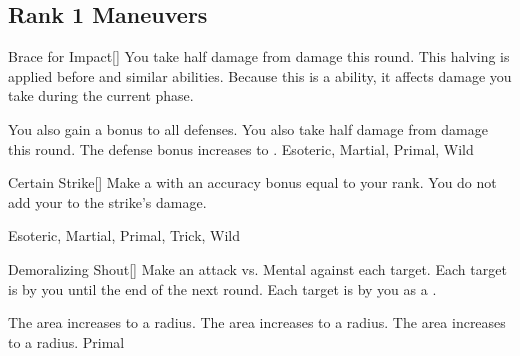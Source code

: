 \subsection{Rank 1 Maneuvers}

\lowercase{\hypertarget{maneuver:Brace for Impact}{}}\label{maneuver:Brace for Impact}
\hypertarget{maneuver:Brace for Impact}{}
\begin{freeability}[Rank 1]{Brace for Impact}[]
You take half damage from  damage this round.
This halving is applied before  and similar abilities.
Because this is a  ability, it affects damage you take during the current phase.

\rankline
{} You also gain a  bonus to all defenses.
 You also take half damage from  damage this round.
 The defense bonus increases to .
 Esoteric, Martial, Primal, Wild
\end{freeability}
\vspace{0.25em}



\lowercase{\hypertarget{maneuver:Certain Strike}{}}\label{maneuver:Certain Strike}
\hypertarget{maneuver:Certain Strike}{}
\begin{freeability}[Rank 1]{Certain Strike}[]
Make a  with an accuracy bonus equal to your rank.
You do not add your  to the strike's damage.


 Esoteric, Martial, Primal, Trick, Wild
\end{freeability}
\vspace{0.25em}



\lowercase{\hypertarget{maneuver:Demoralizing Shout}{}}\label{maneuver:Demoralizing Shout}
\hypertarget{maneuver:Demoralizing Shout}{}
\begin{freeability}[Rank 1]{Demoralizing Shout}[]
Make an attack vs. Mental against each target.
\hit Each target is  by you until the end of the next round.
\crit Each target is  by you as a .

\rankline
{} The area increases to a \arealarge radius.
 The area increases to a \areahuge radius.
 The area increases to a \areaext radius.
 Primal
\end{freeability}
\vspace{0.25em}



